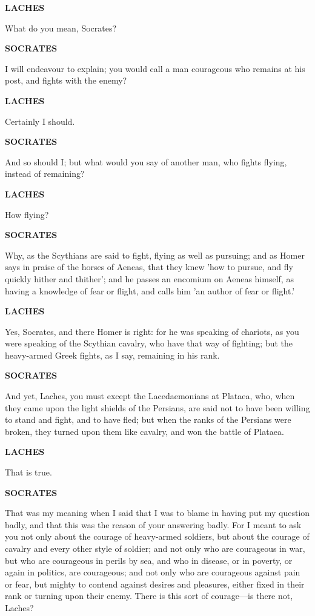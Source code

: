 \documentclass[11pt,letter]{book}
\begin{document}
\par \textbf{LACHES}
\par   What do you mean, Socrates?

\par \textbf{SOCRATES}
\par   I will endeavour to explain; you would call a man courageous who remains at his post, and fights with the enemy?

\par \textbf{LACHES}
\par   Certainly I should.

\par \textbf{SOCRATES}
\par   And so should I; but what would you say of another man, who fights flying, instead of remaining?

\par \textbf{LACHES}
\par   How flying?

\par \textbf{SOCRATES}
\par   Why, as the Scythians are said to fight, flying as well as pursuing; and as Homer says in praise of the horses of Aeneas, that they knew 'how to pursue, and fly quickly hither and thither'; and he passes an encomium on Aeneas himself, as having a knowledge of fear or flight, and calls him 'an author of fear or flight.'

\par \textbf{LACHES}
\par   Yes, Socrates, and there Homer is right:  for he was speaking of chariots, as you were speaking of the Scythian cavalry, who have that way of fighting; but the heavy-armed Greek fights, as I say, remaining in his rank.

\par \textbf{SOCRATES}
\par   And yet, Laches, you must except the Lacedaemonians at Plataea, who, when they came upon the light shields of the Persians, are said not to have been willing to stand and fight, and to have fled; but when the ranks of the Persians were broken, they turned upon them like cavalry, and won the battle of Plataea.

\par \textbf{LACHES}
\par   That is true.

\par \textbf{SOCRATES}
\par   That was my meaning when I said that I was to blame in having put my question badly, and that this was the reason of your answering badly. For I meant to ask you not only about the courage of heavy-armed soldiers, but about the courage of cavalry and every other style of soldier; and not only who are courageous in war, but who are courageous in perils by sea, and who in disease, or in poverty, or again in politics, are courageous; and not only who are courageous against pain or fear, but mighty to contend against desires and pleasures, either fixed in their rank or turning upon their enemy. There is this sort of courage—is there not, Laches?
\end{document}
